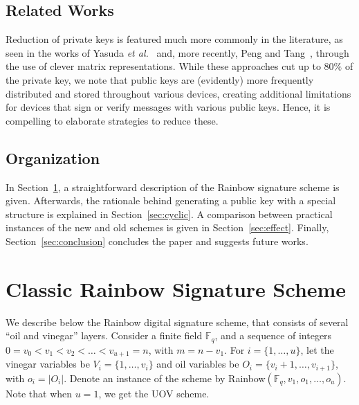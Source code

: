 \documentclass[12pt]{article}
\begin{document}
\subsection{Related Works}
Reduction of private keys is featured much more commonly in the literature, as seen in the works of Yasuda \emph{et al.}~\cite{Yasuda:inproc:2013:may, Yasuda:inproc:2014:apr, Yasuda:article:2014:sep} and, more recently, Peng and Tang~\cite{Peng:article:2017:jun}, through the use of clever matrix representations. While these approaches cut up to $80\%$ of the private key, we note that public keys are (evidently) more frequently distributed and stored throughout various devices, creating additional limitations for devices that sign or verify messages with various public keys. Hence, it is compelling to elaborate strategies to reduce these.

\subsection{Organization}
In Section~\ref{sec:rainbow}, a straightforward description of the Rainbow signature scheme is given. Afterwards, the rationale behind generating a public key with a special structure is explained in Section~\ref{sec:cyclic}. A comparison between practical instances of the new and old schemes is given in Section~\ref{sec:effect}. Finally, Section~\ref{sec:conclusion} concludes the paper and suggests future works.

\section{Classic Rainbow Signature Scheme}\label{sec:rainbow}

We describe below the Rainbow digital signature scheme, that consists of several ``oil and vinegar'' layers. Consider a finite field $\mathbb{F}_{q}$, and a sequence of integers $0 = v_{0} < v_{1} < v_{2} < \dots < v_{u+1} = n$, with $m = n - v_{1}$. For $i = \{1, \dots, u\}$, let the vinegar variables be $V_{i} = \{1, \dots, v_{i}\}$ and oil variables be $O_{i} = \{v_{i} + 1, \dots, v_{i+1}\}$, with $o_{i} = |O_{i}|$. Denote an instance of the scheme by Rainbow$(\mathbb{F}_{q}, v_{1}, o_{1}, \dots, o_{u})$. Note that when $u = 1$, we get the UOV scheme. 
\end{document}
